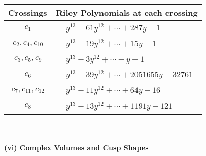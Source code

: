 \documentclass[1p]{elsarticle_modified}
\theoremstyle{definition}
\begin{document}
\begin{tabular}{m{50pt}|m{274pt}}
Crossings & \hspace{64pt}Riley Polynomials at each crossing \\
\hline $$\begin{aligned}c_{1}\end{aligned}$$&$\begin{aligned}
&y^{13}-61 y^{12}+\cdots+287 y-1
\end{aligned}$\\
\hline $$\begin{aligned}c_{2},c_{4},c_{10}\end{aligned}$$&$\begin{aligned}
&y^{13}+19 y^{12}+\cdots+15 y-1
\end{aligned}$\\
\hline $$\begin{aligned}c_{3},c_{5},c_{9}\end{aligned}$$&$\begin{aligned}
&y^{13}+3 y^{12}+\cdots- y-1
\end{aligned}$\\
\hline $$\begin{aligned}c_{6}\end{aligned}$$&$\begin{aligned}
&y^{13}+39 y^{12}+\cdots+2051655 y-32761
\end{aligned}$\\
\hline $$\begin{aligned}c_{7},c_{11},c_{12}\end{aligned}$$&$\begin{aligned}
&y^{13}+11 y^{12}+\cdots+64 y-16
\end{aligned}$\\
\hline $$\begin{aligned}c_{8}\end{aligned}$$&$\begin{aligned}
&y^{13}-13 y^{12}+\cdots+1191 y-121
\end{aligned}$\\
\hline
\end{tabular}\\~\\
\newpage\flushleft \textbf{(vi) Complex Volumes and Cusp Shapes}
\end{document}
